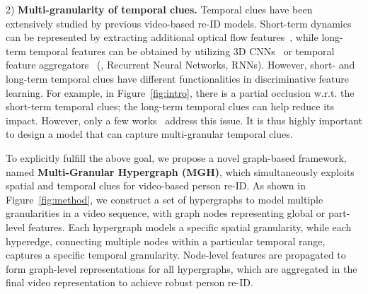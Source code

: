 \documentclass[10pt,twocolumn,letterpaper]{article}
\begin{document}
2) \textbf{Multi-granularity of temporal clues.} Temporal clues have been extensively studied by previous video-based re-ID models. Short-term dynamics can be represented by extracting additional optical flow features~\cite{DBLP:conf/iccv/ChungTD17}, while long-term temporal features can be obtained by utilizing 3D CNNs~\cite{DBLP:conf/aaai/LiZH19} or temporal feature aggregators~\cite{DBLP:conf/cvpr/McLaughlinRM16} (\eg, Recurrent Neural Networks, RNNs). However, short- and long-term temporal clues have different functionalities in discriminative feature learning. For example, in Figure~\ref{fig:intro}, there is a partial occlusion w.r.t. the short-term temporal clues; the long-term temporal clues can help reduce its impact. However, only a few works~\cite{DBLP:journals/corr/abs-1908-10049,DBLP:conf/aaai/LiZH19} address this issue. It is thus highly important to design a model that can capture multi-granular temporal clues.

To explicitly fulfill the above goal, we propose a novel graph-based framework, named \textbf{Multi-Granular Hypergraph (MGH)}, which simultaneously exploits spatial and temporal clues for video-based person re-ID. As shown in Figure~\ref{fig:method}, we construct a set of hypergraphs to model multiple granularities in a video sequence, with graph nodes representing global or part-level features. Each hypergraph models a specific spatial granularity, while each hyperedge, connecting multiple nodes within a particular temporal range, captures a specific temporal granularity. Node-level features are propagated to form graph-level representations for all hypergraphs, which are aggregated in the final video representation to achieve robust person re-ID.
\end{document}
